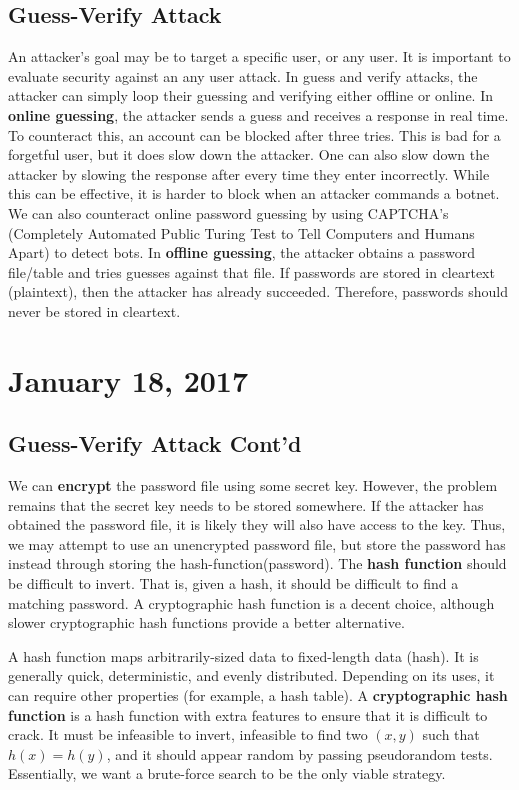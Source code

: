 \documentclass[11pt]{article}
\theoremstyle{plain} %
\theoremstyle{definition}
\theoremstyle{example}
\theoremstyle{remark}
\begin{document}
\subsection{Guess-Verify Attack}

An attacker's goal may be to target a specific user, or any user. It is important to evaluate security against an any user attack. In guess and verify attacks, the attacker can simply loop their guessing and verifying either offline or online. In \textbf{online guessing}, the attacker sends a guess and receives a response in real time. To counteract this, an account can be blocked after three tries. This is bad for a forgetful user, but it does slow down the attacker. One can also slow down the attacker by slowing the response after every time they enter incorrectly. While this can be effective, it is harder to block when an attacker commands a botnet. We can also counteract online password guessing by using CAPTCHA's (Completely Automated Public Turing Test to Tell Computers and Humans Apart) to detect bots. In \textbf{offline guessing}, the attacker obtains a password file/table and tries guesses against that file. If passwords are stored in cleartext (plaintext), then the attacker has already succeeded. Therefore, passwords should never be stored in cleartext. 

\section{January 18, 2017}

\subsection{Guess-Verify Attack Cont'd}

We can \textbf{encrypt} the password file using some secret key. However, the problem remains that the secret key needs to be stored somewhere. If the attacker has obtained the password file, it is likely they will also have access to the key. Thus, we may attempt to use an unencrypted password file, but store the password has instead through storing the hash-function(password). The \textbf{hash function} should be difficult to invert. That is, given a hash, it should be difficult to find a matching password. A cryptographic hash function is a decent choice, although slower cryptographic hash functions provide a better alternative. 

A hash function maps arbitrarily-sized data to fixed-length data (hash). It is generally quick, deterministic, and evenly distributed. Depending on its uses, it can require other properties (for example, a hash table). A \textbf{cryptographic hash function} is a hash function with extra features to ensure that it is difficult to crack. It must be infeasible to invert, infeasible to find two $(x,y)$ such that $h(x)=h(y)$, and it should appear random by passing pseudorandom tests. Essentially, we want a brute-force search to be the only viable strategy. 
\end{document}
